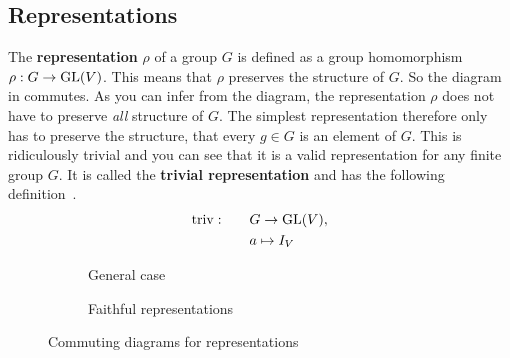 \subsection{Representations}

The \textbf{representation} $\rho$ of a group $G$ is defined as a group homomorphism $\rho: G \to \operatorname{GL}(V)$.
This means that $\rho$ preserves the structure of $G$.
So the diagram in  commutes.
As you can infer from the diagram, the representation $\rho$ does not have to preserve \textit{all} structure of $G$.
The simplest representation therefore only has to preserve the structure, that every $g \in G$ is an element of $G$.
This is ridiculously trivial and you can see that it is a valid representation for any finite group $G$.
It is called the \textbf{trivial representation} and has the following definition~\cite{hein2013}.
\begin{subequations}
\begin{align}
    \operatorname{triv}: \qquad & G \to \operatorname{GL}(V), \\
    & a \mapsto I_V
\end{align}
\end{subequations}

\begin{figure}[h]
    \begin{subfigure}{.5 \textwidth}
        \centering
        \caption{General case}
        \label{fig:main.what.rep-cd}
    \end{subfigure}
    \begin{subfigure}{.5 \textwidth}
        \centering
        \caption{Faithful representations}
        \label{fig:main.what.faith-rep-cd}
    \end{subfigure}
    \caption{Commuting diagrams for representations}
\end{figure}

